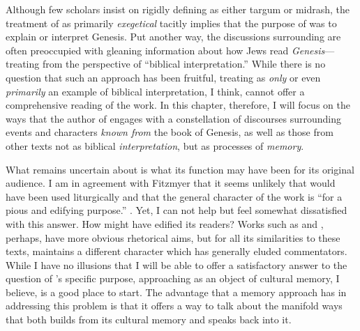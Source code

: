 Although few scholars insist on rigidly defining \ga as either targum or midrash, the treatment of \ga as primarily \emph{exegetical} tacitly implies that the purpose of \ga was to explain or interpret Genesis. Put another way, the discussions surrounding \ga are often preoccupied with gleaning information about how \secondtemple Jews read \emph{Genesis}---treating \ga from the perspective of ``biblical interpretation.'' While there is no question that such an approach has been fruitful, treating \ga as \emph{only} or even \emph{primarily} an example of biblical interpretation, I think, cannot offer a comprehensive reading of the work. In this chapter, therefore, I will focus on the ways that the author of \ga engages with a  constellation of discourses surrounding events and characters \emph{known from} the book of Genesis, as well as those from other texts not as biblical \emph{interpretation}, but as processes of \emph{memory}.

What remains uncertain about \ga is what its function may have been for its original audience. I am in agreement with Fitzmyer that it seems unlikely that \ga would have been used liturgically and that the general character of the work is ``for a pious and edifying purpose.''%
    \autocite[20]{fitzmyer2004}.
Yet, I can not help but feel somewhat dissatisfied with this answer. How might \ga have edified its readers? Works such as \jub and \firstenoch, perhaps, have more obvious rhetorical aims, but for all its similarities to these texts, \ga maintains a different character which has generally eluded commentators. While I have no illusions that I will be able to offer a satisfactory answer to the question of \ga's specific purpose, approaching \ga as an object of cultural memory, I believe, is a good place to start. The advantage that a memory approach has in addressing this problem is that it offers a way to talk about the manifold ways that \ga both builds from its cultural memory and speaks back into it.

